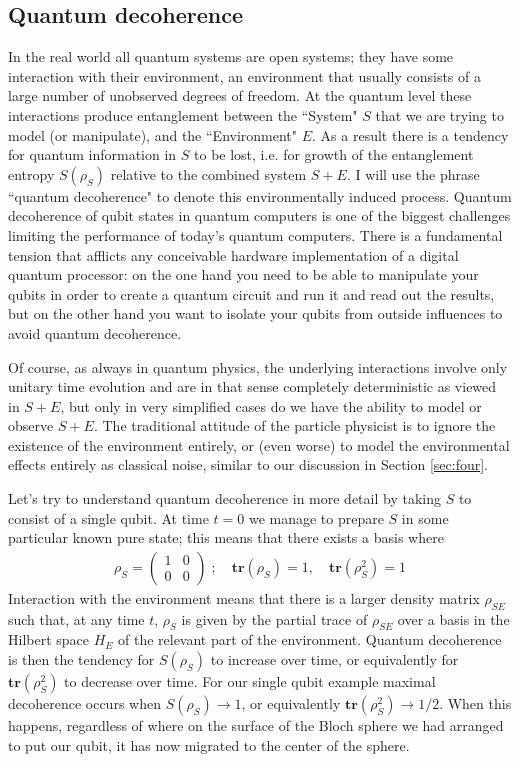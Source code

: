 \documentclass[a4paper,11pt]{article}
\begin{document}
\subsection{Quantum decoherence}\label{ss:decohere}

In the real world all quantum systems are open systems; they have some interaction with their environment, an environment that usually consists of a  large number
of unobserved degrees of freedom. At the quantum level these interactions produce entanglement between the ``System"  $S$ that we are trying to model (or manipulate), 
and the ``Environment" $E$. As a result there is a tendency for quantum information in $S$ to be lost, i.e. for growth of the entanglement entropy $S(\rho_S)$ relative to the
combined system $S+E$. I will use the phrase ``quantum decoherence" to denote this environmentally induced process. Quantum decoherence of qubit states in quantum computers
is one of the biggest challenges limiting the performance of today's quantum computers. There is a fundamental tension that afflicts any conceivable hardware
implementation of a digital quantum processor: on the one hand you need to be able to manipulate your qubits in order to create a quantum circuit and run it
and read out the results, but on the
other hand you want to isolate your qubits from outside influences to avoid quantum decoherence.

Of course, as always in quantum physics, the underlying interactions involve only unitary time evolution and are in that sense completely deterministic as viewed in $S+E$, but only in very simplified cases do we have the ability to model or observe
$S+E$. The traditional attitude of the particle physicist is to ignore the existence of the environment entirely, or (even worse) to model the environmental effects entirely
as classical noise, similar to our discussion in Section \ref{sec:four}.

Let's try to understand quantum decoherence in more detail by taking $S$ to consist of a single qubit. At time $t=0$ we manage to prepare $S$ in some particular known
pure state; this means that there exists a basis where
\begin{eqnarray}
\rho_S = 
\begin{pmatrix} 1 & 0 \\ 0 & 0 \end{pmatrix}
\;;\quad \bm{tr}(\rho_S) = 1,
\quad  \bm{tr}(\rho^2_S) = 1
\end{eqnarray}
Interaction with the environment means that there is a larger density matrix $\rho_{SE}$ such that, at any time $t$, $\rho_S$ is given by the partial trace
of $\rho_{SE}$ over a basis in the Hilbert space $H_E$ of the relevant part of the environment. Quantum decoherence is then the tendency for
$S(\rho_S)$ to increase over time, or equivalently for $\bm{tr}(\rho^2_S)$ to decrease over time. For our single qubit example maximal decoherence occurs
when $S(\rho_S) \to 1$, or equivalently $\bm{tr}(\rho^2_S) \to 1/2$. When this happens, regardless of where on the surface of the Bloch sphere we had arranged
to put our qubit, it has now migrated to the center of the sphere.
\end{document}
